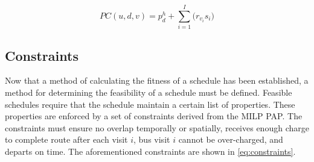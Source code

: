 \documentclass[ee,msthesis]{usuthesis}
\newcommand{\PC}{PC(u, d, v)}               %
\begin{document}
\begin{equation}
\label{eq:pc}
\PC = p^h_d + \sum_{i=1}^I \Big( r_{v_i}s_i \Big)
\end{equation}

\subsection{Constraints}
\label{sec:constraints}
Now that a method of calculating the fitness of a schedule has been established, a method for determining the
feasibility of a schedule must be defined. Feasible schedules require that the schedule maintain a certain list of
properties. These properties are enforced by a set of constraints derived from the MILP PAP. The constraints must ensure
no overlap temporally or spatially, receives enough charge to complete route after each visit \(i\), bus visit \(i\) cannot
be over-charged, and departs on time. The aforementioned constraints are shown in \ref{eq:constraints}.
\end{document}
